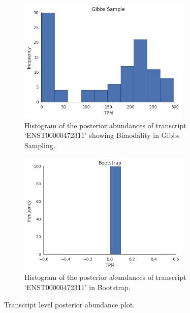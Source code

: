 \documentclass{article}
\begin{document}
\begin{figure}
  \centering
  \begin{subfigure}[t]{0.46\textwidth}
    \centering
    \includegraphics[width=0.9\textwidth]{figures/gibbsHist.png}
    \caption{ \label{fig:gibbsHist}Histogram of the posterior abundances of transcript `ENST00000472311' showing Bimodality in Gibbs Sampling.}
  \end{subfigure}
  \qquad
  \begin{subfigure}[t]{0.46\textwidth}
    \centering
      \includegraphics[width=0.9\textwidth]{figures/bootHist.png}
      \caption{\label{fig:bootHist}Histogram of the posterior abundances of transcript `ENST00000472311' in Bootstrap.}
  \end{subfigure}
  \caption{\label{fig:bimodal} Transcript level posterior abundance plot.}
\end{figure}

 
\end{document}
